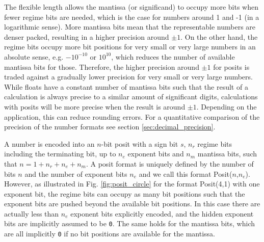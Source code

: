 The flexible length allows the mantissa (or significand) to occupy more bits when fewer regime bits are needed, which is the
case for numbers around 1 and -1 (in a logarithmic sense). More mantissa bits mean that the representable numbers are
denser packed, resulting in a higher precision around $\pm 1$. On the other hand, the regime bits occupy more bit positions
for very small or very large numbers in an absolute sense, e.g. $-10^{-10}$ or $10^{10}$, which reduces the number of 
available mantissa bits for those. Therefore, the higher precision around $\pm 1$ for posits is traded against a gradually
lower precision for very small or very large numbers. While floats have a constant number of mantissa bits such that
the result of a calculation is always precise to a similar amount of significant digits, calculations with posits will be more precise
when the result is around $\pm 1$. Depending on the application, this can reduce rounding errors. For a quantitative comparison
of the precision of the number formats see section \ref{sec:decimal_precision}.

A number is encoded into an $n$-bit posit with a sign bit $s$, $n_r$ regime bits including the terminating bit, up to $n_e$ exponent bits
and $n_m$ mantissa bits, such that $n = 1 + n_r + n_e + n_m$. A posit format is uniquely defined by the number of bits $n$
and the number of exponent bits $n_e$ and we call this format Posit($n$,$n_e$). However, as illustrated in Fig. \ref{fig:posit_circle}
for the format Posit(4,1) with one exponent bit, the regime bits can occupy as many bit positions such that the exponent bits
are pushed beyond the available bit positions. In this case there are actually less than $n_e$ exponent bits explicitly encoded,
and the hidden exponent bits are implicitly assumed to be \texttt{0}. The same holds for the mantissa bits, which are all
implicitly \texttt{0} if no bit positions are available for the mantissa.

